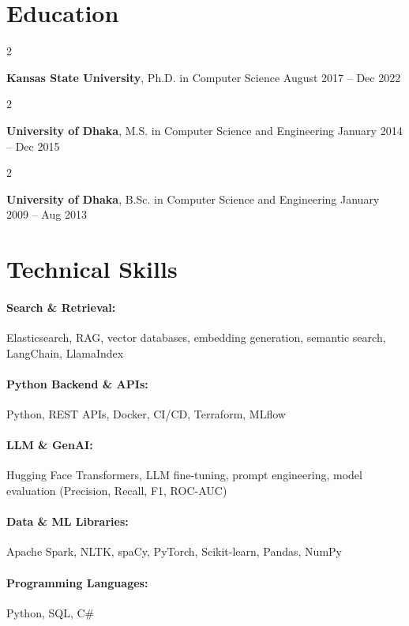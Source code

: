 \documentclass[10pt, letterpaper]{article}
\newenvironment{twocolentry}[2][]{
    \onecolentry
    \def\secondColumn{#2}
    \setcolumnwidth{\fill, 4.5 cm}
    \begin{paracol}{2}
}{
    \switchcolumn \raggedleft \secondColumn
    \end{paracol}
    \endonecolentry
}
\begin{document}
\section{Education}

        \begin{twocolentry}{
            August 2017 -- Dec 2022
        }
            \textbf{Kansas State University}, Ph.D. in Computer Science\end{twocolentry}

        \begin{twocolentry}{
            January 2014 -- Dec 2015
        }
            \textbf{University of Dhaka}, M.S. in Computer Science and Engineering\end{twocolentry}

        \begin{twocolentry}{
            January 2009 -- Aug 2013
        }
            \textbf{University of Dhaka}, B.Sc. in Computer Science and Engineering\end{twocolentry}

\vspace{-1mm}
\section{Technical Skills}

        \paragraph{Search \& Retrieval:} Elasticsearch, RAG, vector databases, embedding generation, semantic search, LangChain, LlamaIndex
        \vspace{-4mm}
        \paragraph{Python Backend \& APIs:} Python, REST APIs, Docker, CI/CD, Terraform, MLflow
        \vspace{-4mm}
        \paragraph{LLM \& GenAI:} Hugging Face Transformers, LLM fine-tuning, prompt engineering, model evaluation (Precision, Recall, F1, ROC-AUC)
        \vspace{-4mm}
        \paragraph{Data \& ML Libraries:} Apache Spark, NLTK, spaCy, PyTorch, Scikit-learn, Pandas, NumPy
        \vspace{-4mm}
        \paragraph{Programming Languages:} Python, SQL, C\#
\end{document}
